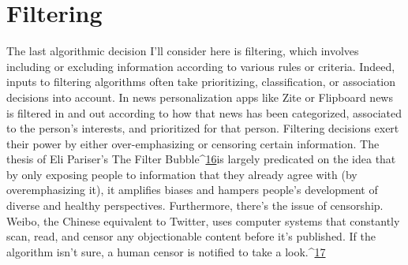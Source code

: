 \section{Filtering }
The last algorithmic decision I'll consider here is filtering, which involves including or excluding information according to various rules or criteria. Indeed, inputs to filtering algorithms often take prioritizing, classification, or association decisions into account. In news personalization apps like Zite or Flipboard news is filtered in and out according to how that news has been categorized, associated to the person's interests, and prioritized for that person. 
Filtering decisions exert their power by either over-emphasizing or censoring certain information. The thesis of Eli Pariser's The Filter Bubble^{\href{#endnotes}{16}}is largely predicated on the idea that by only exposing people to information that they already agree with (by overemphasizing it), it amplifies biases and hampers people's development of diverse and healthy perspectives. Furthermore, there's the issue of censorship. Weibo, the Chinese equivalent to Twitter, uses computer systems that constantly scan, read, and censor any objectionable content before it's published. If the algorithm isn't sure, a human censor is notified to take a look.^{\href{#endnotes}{17}}

